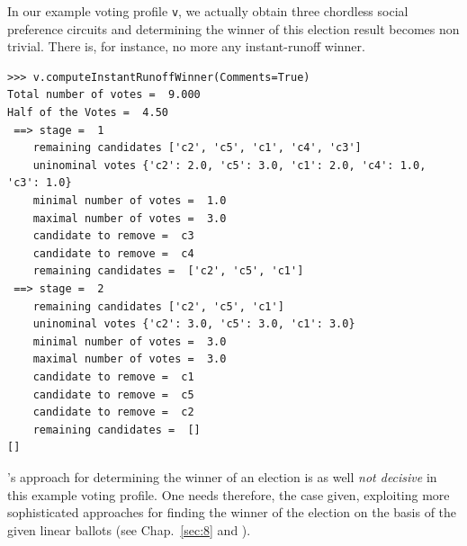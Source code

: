 In our example voting profile \texttt{v}, we actually obtain three chordless social preference circuits and determining the winner of this election result becomes non trivial. There is, for instance, no more any instant-runoff winner.
\begin{lstlisting}
>>> v.computeInstantRunoffWinner(Comments=True)
Total number of votes =  9.000
Half of the Votes =  4.50
 ==> stage =  1
    remaining candidates ['c2', 'c5', 'c1', 'c4', 'c3']
    uninominal votes {'c2': 2.0, 'c5': 3.0, 'c1': 2.0, 'c4': 1.0, 'c3': 1.0}
    minimal number of votes =  1.0
    maximal number of votes =  3.0
    candidate to remove =  c3
    candidate to remove =  c4
    remaining candidates =  ['c2', 'c5', 'c1']
 ==> stage =  2
    remaining candidates ['c2', 'c5', 'c1']
    uninominal votes {'c2': 3.0, 'c5': 3.0, 'c1': 3.0}
    minimal number of votes =  3.0
    maximal number of votes =  3.0
    candidate to remove =  c1
    candidate to remove =  c5
    candidate to remove =  c2
    remaining candidates =  []
[]
\end{lstlisting}

\Condorcet 's approach for determining the winner of an election is as well \emph{not decisive} in this example voting profile. One needs therefore, the case given, exploiting more sophisticated approaches for finding the winner of the election on the basis of the given linear ballots (see Chap.~\ref{sec:8} and \citet{BIS-2008a}). 


